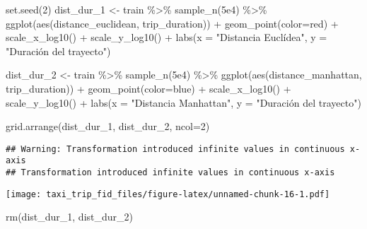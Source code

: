 \documentclass[
]{article}
\newenvironment{Shaded}{\begin{snugshade}}{\end{snugshade}}
\newcommand{\AttributeTok}[1]{\textcolor[rgb]{0.77,0.63,0.00}{#1}}
\newcommand{\DecValTok}[1]{\textcolor[rgb]{0.00,0.00,0.81}{#1}}
\newcommand{\FloatTok}[1]{\textcolor[rgb]{0.00,0.00,0.81}{#1}}
\newcommand{\FunctionTok}[1]{\textcolor[rgb]{0.00,0.00,0.00}{#1}}
\newcommand{\NormalTok}[1]{#1}
\newcommand{\OtherTok}[1]{\textcolor[rgb]{0.56,0.35,0.01}{#1}}
\newcommand{\SpecialCharTok}[1]{\textcolor[rgb]{0.00,0.00,0.00}{#1}}
\newcommand{\StringTok}[1]{\textcolor[rgb]{0.31,0.60,0.02}{#1}}
\begin{document}
\begin{Shaded}
\begin{Highlighting}[]
\FunctionTok{set.seed}\NormalTok{(}\DecValTok{2}\NormalTok{)}
\NormalTok{dist\_dur\_1 }\OtherTok{\textless{}{-}}\NormalTok{ train }\SpecialCharTok{\%\textgreater{}\%}
  \FunctionTok{sample\_n}\NormalTok{(}\FloatTok{5e4}\NormalTok{) }\SpecialCharTok{\%\textgreater{}\%}
  \FunctionTok{ggplot}\NormalTok{(}\FunctionTok{aes}\NormalTok{(distance\_euclidean, trip\_duration)) }\SpecialCharTok{+}
  \FunctionTok{geom\_point}\NormalTok{(}\AttributeTok{color=}\StringTok{\textquotesingle{}red\textquotesingle{}}\NormalTok{) }\SpecialCharTok{+}
  \FunctionTok{scale\_x\_log10}\NormalTok{() }\SpecialCharTok{+}
  \FunctionTok{scale\_y\_log10}\NormalTok{() }\SpecialCharTok{+}
  \FunctionTok{labs}\NormalTok{(}\AttributeTok{x =} \StringTok{"Distancia Euclídea"}\NormalTok{, }\AttributeTok{y =} \StringTok{"Duración del trayecto"}\NormalTok{)}

\NormalTok{dist\_dur\_2 }\OtherTok{\textless{}{-}}\NormalTok{ train }\SpecialCharTok{\%\textgreater{}\%}
  \FunctionTok{sample\_n}\NormalTok{(}\FloatTok{5e4}\NormalTok{) }\SpecialCharTok{\%\textgreater{}\%}
  \FunctionTok{ggplot}\NormalTok{(}\FunctionTok{aes}\NormalTok{(distance\_manhattan, trip\_duration)) }\SpecialCharTok{+}
  \FunctionTok{geom\_point}\NormalTok{(}\AttributeTok{color=}\StringTok{\textquotesingle{}blue\textquotesingle{}}\NormalTok{) }\SpecialCharTok{+}
  \FunctionTok{scale\_x\_log10}\NormalTok{() }\SpecialCharTok{+}
  \FunctionTok{scale\_y\_log10}\NormalTok{() }\SpecialCharTok{+}
  \FunctionTok{labs}\NormalTok{(}\AttributeTok{x =} \StringTok{"Distancia Manhattan"}\NormalTok{, }\AttributeTok{y =} \StringTok{"Duración del trayecto"}\NormalTok{)}

\FunctionTok{grid.arrange}\NormalTok{(dist\_dur\_1, dist\_dur\_2, }\AttributeTok{ncol=}\DecValTok{2}\NormalTok{)}
\end{Highlighting}
\end{Shaded}

\begin{verbatim}
## Warning: Transformation introduced infinite values in continuous x-axis
## Transformation introduced infinite values in continuous x-axis
\end{verbatim}

\texttt{[image: taxi\_trip\_fid\_files/figure-latex/unnamed-chunk-16-1.pdf]}

\begin{Shaded}
\begin{Highlighting}[]
\FunctionTok{rm}\NormalTok{(dist\_dur\_1, dist\_dur\_2)}
\end{Highlighting}
\end{Shaded}
\end{document}
